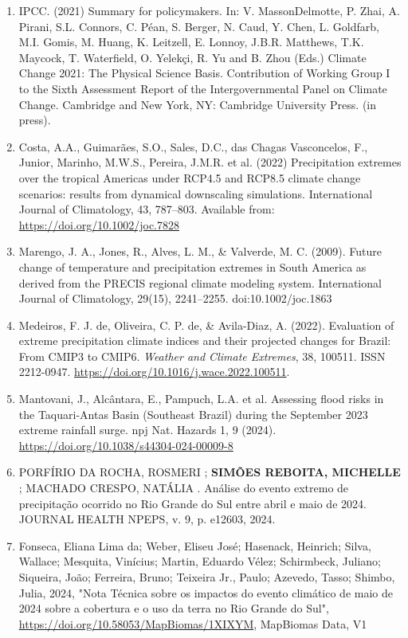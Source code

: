 \documentclass[12pt,a4paper,oneside]{book}
\begin{document}
\begin{enumerate}
\item
  IPCC. (2021) Summary for policymakers. In: V. MassonDelmotte, P. Zhai, A. Pirani, S.L. Connors, C. Péan, S. Berger, N. Caud, Y. Chen, L. Goldfarb, M.I. Gomis, M. Huang, K. Leitzell, E. Lonnoy, J.B.R. Matthews, T.K. Maycock, T. Waterfield, O. Yelekçi, R. Yu and B. Zhou (Eds.) Climate Change 2021: The Physical Science Basis. Contribution of Working Group I to the Sixth Assessment Report of the Intergovernmental Panel on Climate Change. Cambridge and New York, NY: Cambridge University Press. (in press).
\item
  Costa, A.A., Guimarães, S.O., Sales, D.C., das Chagas Vasconcelos, F., Junior, Marinho, M.W.S., Pereira, J.M.R. et al. (2022) Precipitation extremes over the tropical Americas under RCP4.5 and RCP8.5 climate change scenarios: results from dynamical downscaling simulations. International Journal of Climatology, 43, 787--803. Available from: \url{https://doi.org/10.1002/joc.7828}
\item
  Marengo, J. A., Jones, R., Alves, L. M., \& Valverde, M. C. (2009). Future change of temperature and precipitation extremes in South America as derived from the PRECIS regional climate modeling system. International Journal of Climatology, 29(15), 2241--2255. doi:10.1002/joc.1863
\item
  Medeiros, F. J. de, Oliveira, C. P. de, \& Avila-Diaz, A. (2022). Evaluation of extreme precipitation climate indices and their projected changes for Brazil: From CMIP3 to CMIP6. \emph{Weather and Climate Extremes}, 38, 100511. ISSN 2212-0947. \url{https://doi.org/10.1016/j.wace.2022.100511}.
\item
  Mantovani, J., Alcântara, E., Pampuch, L.A. et al. Assessing flood risks in the Taquari-Antas Basin (Southeast Brazil) during the September 2023 extreme rainfall surge. npj Nat. Hazards 1, 9 (2024). \url{https://doi.org/10.1038/s44304-024-00009-8}
\item
  PORFÍRIO DA ROCHA, ROSMERI ; \textbf{SIMÕES REBOITA, MICHELLE} ; MACHADO CRESPO, NATÁLIA . Análise do evento extremo de precipitação ocorrido no Rio Grande do Sul entre abril e maio de 2024. JOURNAL HEALTH NPEPS, v. 9, p. e12603, 2024.
\item
  Fonseca, Eliana Lima da; Weber, Eliseu José; Hasenack, Heinrich; Silva, Wallace; Mesquita, Vinícius; Martin, Eduardo Vélez; Schirmbeck, Juliano; Siqueira, João; Ferreira, Bruno; Teixeira Jr., Paulo; Azevedo, Tasso; Shimbo, Julia, 2024, "Nota Técnica sobre os impactos do evento climático de maio de 2024 sobre a cobertura e o uso da terra no Rio Grande do Sul", \url{https://doi.org/10.58053/MapBiomas/1XIXYM}, MapBiomas Data, V1

\end{enumerate}
\end{document}
